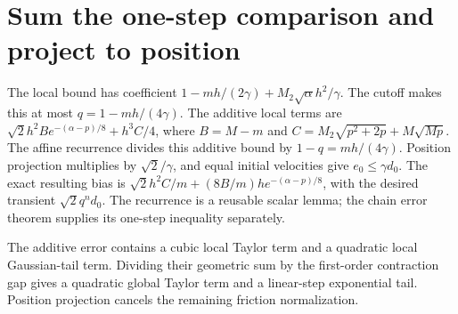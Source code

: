 \documentclass[11pt,a4paper]{article}
\begin{document}
\section{\texorpdfstring{Sum the one-step comparison and project to position}{Sum the one-step comparison and project to position}}


The local bound has coefficient \(1-mh/(2\gamma)+M_2\sqrt\alpha h^2/\gamma\). The cutoff makes this at most \(q=1-mh/(4\gamma)\). The additive local terms are \(\sqrt2h^2B e^{-(\alpha-p)/8}+h^3C/4\), where \(B=M-m\) and \(C=M_2\sqrt{p^2+2p}+M\sqrt{Mp}\). The affine recurrence divides this additive bound by \(1-q=mh/(4\gamma)\). Position projection multiplies by \(\sqrt2/\gamma\), and equal initial velocities give \(e_0\le\gamma d_0\). The exact resulting bias is \(\sqrt2h^2C/m+(8B/m)h e^{-(\alpha-p)/8}\), with the desired transient \(\sqrt2q^nd_0\). The recurrence is a reusable scalar lemma; the chain error theorem supplies its one-step inequality separately.



The additive error contains a cubic local Taylor term and a quadratic local Gaussian-tail term. Dividing their geometric sum by the first-order contraction gap gives a quadratic global Taylor term and a linear-step exponential tail. Position projection cancels the remaining friction normalization.
\end{document}
